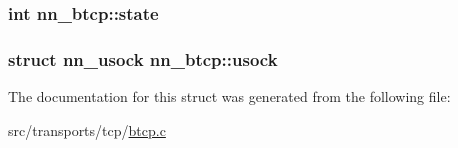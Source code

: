 \subsubsection[{state}]{\setlength{\rightskip}{0pt plus 5cm}int nn\+\_\+btcp\+::state}\hypertarget{structnn__btcp_ac4e1a393ee479ac93b3d700f92099605}{}\label{structnn__btcp_ac4e1a393ee479ac93b3d700f92099605}
\subsubsection[{usock}]{\setlength{\rightskip}{0pt plus 5cm}struct {\bf nn\+\_\+usock} nn\+\_\+btcp\+::usock}\hypertarget{structnn__btcp_a1f5c9c60495f0d5cd20611d3bcc9aaa0}{}\label{structnn__btcp_a1f5c9c60495f0d5cd20611d3bcc9aaa0}


The documentation for this struct was generated from the following file\+:\begin{DoxyCompactItemize}
\item 
src/transports/tcp/\hyperlink{btcp_8c}{btcp.\+c}\end{DoxyCompactItemize}
